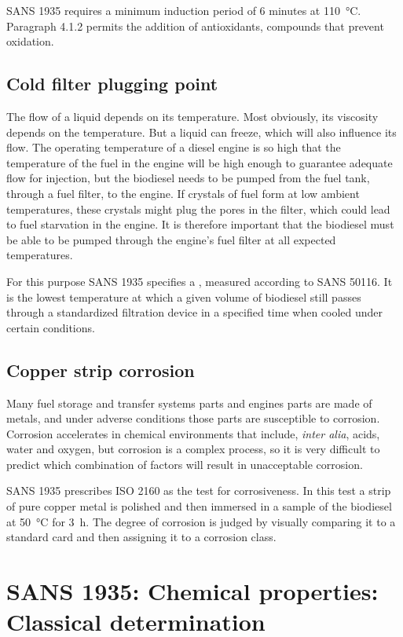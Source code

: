 SANS 1935 requires a minimum induction period of 6 minutes at
\SI{110}{\celsius}. Paragraph 4.1.2 permits the addition of antioxidants,
compounds that prevent oxidation.

\subsection{Cold filter plugging point}

The flow of a liquid depends on its temperature. Most obviously, its viscosity
depends on the temperature. But a liquid can freeze, which will also influence
its flow. The operating temperature of a diesel engine is so high that the
temperature of the fuel in the engine will be high enough to guarantee adequate
flow for injection, but the biodiesel needs to be pumped from the fuel tank,
through a fuel filter, to the engine. If crystals of fuel form at low
ambient temperatures, these crystals might plug the pores in the filter, which could
lead to fuel starvation in the engine. It is therefore important that the
biodiesel must be able to be pumped through the engine's fuel filter at all
expected temperatures.

For this purpose SANS 1935 specifies a ,
measured according to SANS 50116. It is the lowest temperature at which a given
volume of biodiesel still passes through a standardized filtration device in a
specified time when cooled under certain conditions. 

\subsection{Copper strip corrosion}

Many fuel storage  and transfer systems parts and engines parts are made of
metals, and under adverse conditions those parts are susceptible to corrosion.
Corrosion accelerates in chemical environments that include, \textit{inter
alia}, acids, water and oxygen, but corrosion is a complex process, so it is
very difficult to predict which combination of factors will result in
unacceptable corrosion.

SANS 1935 prescribes ISO 2160 as the test for corrosiveness. In this test a
strip of pure copper metal is polished and then immersed in a sample of the
biodiesel at \SI{50}{\celsius} for \SI{3}{\hour}. The degree of corrosion is
judged by visually comparing it to a standard card and then assigning it to a
corrosion class.

\section{SANS 1935: Chemical properties: Classical determination}

